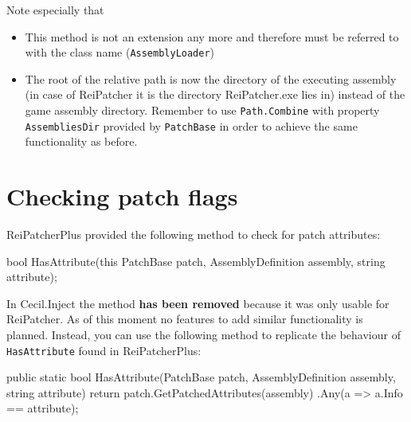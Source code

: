 \documentclass[a4paper,11pt]{article}
\newcommand{\CecilInject}{\textsc{C}{\scriptsize \sc ecil}.\textsc{I}{\scriptsize \sc nject}}
\begin{document}
\newpage
Note especially that
\begin{itemize}
\item This method is not an extension any more and therefore must be referred to with the class name (\texttt{AssemblyLoader})
\item The root of the relative path is now the directory of the executing assembly (in case of ReiPatcher it is the directory ReiPatcher.exe lies in) instead of the game assembly directory. Remember to use \texttt{Path.Combine} with property \texttt{AssembliesDir} provided by \texttt{PatchBase} in order to achieve the same functionality as before.
\end{itemize}

\section{Checking patch flags}
ReiPatcherPlus provided the following method to check for patch attributes:
\begin{cs}
bool HasAttribute(this PatchBase patch, 
                  AssemblyDefinition assembly, 
                  string attribute);
\end{cs}
In \CecilInject{} the method \textbf{has been removed} because it was only usable for ReiPatcher. As of this moment no features to add similar functionality is planned. Instead, you can use the following method to replicate the behaviour of \texttt{HasAttribute} found in ReiPatcherPlus:
\begin{cs}
public static bool HasAttribute(PatchBase patch, 
                                AssemblyDefinition assembly, 
                                string attribute)
{
	return patch.GetPatchedAttributes(assembly)
                    .Any(a => a.Info == attribute);
}
\end{cs}
\end{document}
